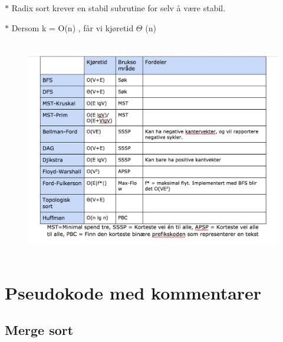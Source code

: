 \documentclass[12pt]{report}
\begin{document}
\vspace{\baselineskip}
{\fontsize{10pt}{12.0pt}\selectfont $\ast$ Radix sort krever en stabil subrutine for selv å være stabil.\par}\par

{\fontsize{10pt}{12.0pt}\selectfont $\ast$ Dersom k = O(n) , får vi kjøretid $ \Theta $ (n)\par}\par


\vspace{\baselineskip}



\begin{figure}[H]
	\begin{Center}
		\includegraphics[width=5.08in,height=3.77in]{./media/image151.png}
	\end{Center}
\end{figure}






\newpage
\par

\section*{Pseudokode med kommentarer}
\subsection*{Merge sort}
\end{document}
